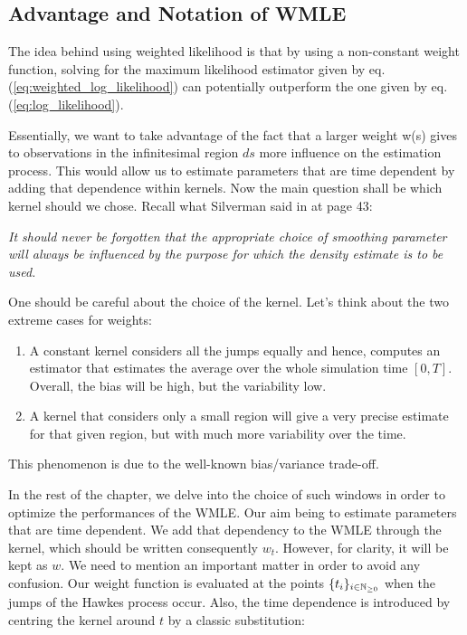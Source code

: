 \documentclass[11pt]{book}
\newcommand{\sequence}[1]{\{ #1 \}_{ i \in \N} }
\begin{document}
\subsection{Advantage and Notation of WMLE}

The idea behind using weighted likelihood is that by using a non-constant weight function, solving for the maximum likelihood estimator given by eq. (\ref{eq:weighted_log_likelihood}) can potentially outperform the one given by eq. (\ref{eq:log_likelihood}). 

Essentially, we want to take advantage of the fact that a larger weight w(s) gives to observations in the infinitesimal region $ds$ more influence on the estimation process. This would allow us to estimate parameters that are time dependent by adding that dependence within kernels. Now the main question shall be which kernel should we chose. Recall what Silverman said in \cite{Silverman} at page 43:

\vspace{0.5cm}
\textit{It should never be forgotten that the appropriate choice of smoothing parameter will always be influenced by the purpose for which the density estimate is to be used. }
\vspace{0.5cm}

One should be careful about the choice of the kernel. Let's think about the two extreme cases for weights: 

\begin{enumerate}
\item A constant kernel considers all the jumps equally and hence, computes an estimator that estimates the average over the whole simulation time $[0,T]$. Overall, the bias will be high, but the variability low.
\item A kernel that considers only a small region will give a very precise estimate for that given region, but with much more variability over the time.
\end{enumerate}

This phenomenon is due to the well-known bias/variance trade-off.
\label{section:bias-variance_trade-off}

\label{section:kernel_weights_first_conversation}
In the rest of the chapter, we delve into the choice of such windows in order to optimize the performances of the WMLE. Our aim being to estimate parameters that are time dependent. We add that dependency to the WMLE through the kernel, which should be written consequently $w_t$. However, for clarity, it will be kept as $w$. We need to mention an important matter in order to avoid any confusion. Our weight function is evaluated at the points $\sequence{t_i}$ when the jumps of the Hawkes process occur. Also, the time dependence is introduced by centring the kernel around $t$ by a classic substitution: 
\end{document}
